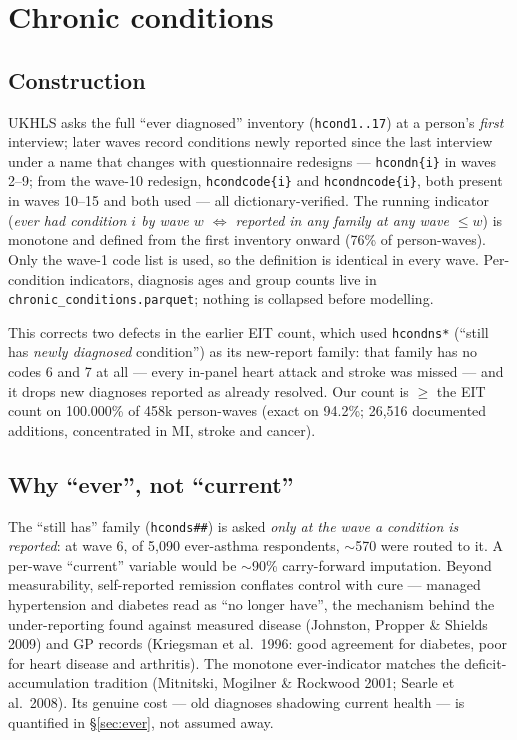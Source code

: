 \documentclass[11pt]{article}
\newcommand{\code}[1]{\texttt{\small #1}}
\begin{document}
\section{Chronic conditions}
\label{sec:chronic}

\subsection{Construction}
UKHLS asks the full ``ever diagnosed'' inventory (\code{hcond1..17}) at a
person's \emph{first} interview; later waves record conditions newly reported
since the last interview under a name that changes with questionnaire
redesigns --- \code{hcondn\{i\}} in waves 2--9; from the wave-10 redesign,
\code{hcondcode\{i\}} and \code{hcondncode\{i\}}, both present in waves
10--15 and both used --- all dictionary-verified. The
running indicator (\emph{ever had condition $i$ by wave $w$ $\Leftrightarrow$
reported in any family at any wave $\le w$}) is monotone and defined from the
first inventory onward (76\% of person-waves). Only the wave-1 code list is
used, so the definition is identical in every wave. Per-condition indicators,
diagnosis ages and group counts live in
\code{chronic\_conditions.parquet}; nothing is collapsed before modelling.

This corrects two defects in the earlier EIT count, which used
\code{hcondns*} (``still has \emph{newly diagnosed} condition'') as its
new-report family: that family has no codes 6 and 7 at all --- every
in-panel heart attack and stroke was missed --- and it drops new diagnoses
reported as already resolved. Our count is $\ge$ the EIT count on
100.000\% of 458k person-waves (exact on 94.2\%; 26{,}516 documented
additions, concentrated in MI, stroke and cancer).

\subsection{Why ``ever'', not ``current''}
The ``still has'' family (\code{hconds\#\#}) is asked \emph{only at the wave
a condition is reported}: at wave 6, of 5{,}090 ever-asthma respondents,
$\sim$570 were routed to it. A per-wave ``current'' variable would be
$\sim$90\% carry-forward imputation. Beyond measurability, self-reported
remission conflates control with cure --- managed hypertension and diabetes
read as ``no longer have'', the mechanism behind the under-reporting found
against measured disease (Johnston, Propper \& Shields 2009) and GP records
(Kriegsman et al.\ 1996: good agreement for diabetes, poor for heart disease
and arthritis). The monotone ever-indicator matches the deficit-accumulation
tradition (Mitnitski, Mogilner \& Rockwood 2001; Searle et al.\ 2008). Its
genuine cost --- old diagnoses shadowing current health --- is quantified in
\S\ref{sec:ever}, not assumed away.
\end{document}
